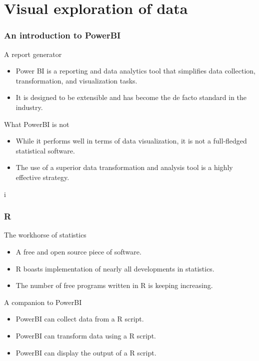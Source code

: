 \documentclass[main.tex]{subfiles}
\begin{document}
\section{Visual exploration of data}
\begin{frame}
    \frametitle{An introduction to PowerBI}
\begin{block}{A report generator}
    \begin{itemize}
        \item<+-> Power BI is a reporting and data analytics tool
        that simplifies data collection, transformation, 
        and visualization tasks.
        \item<+-> It is designed to be extensible and has become
        the de facto standard in the industry.
    \end{itemize}
\end{block}
\begin{block}{What PowerBI is not}
    \begin{itemize}
        \item<+-> While it performs well in terms of data visualization,
         it is not a full-fledged statistical software.
        \item<+-> The use of a superior data transformation
         and analysis tool is a highly effective strategy.
    \end{itemize}
\end{block}    i
\end{frame}
\begin{frame}
    \frametitle{R}
\begin{block}{The workhorse of statistics}
    \begin{itemize}
        \item<+-> A free and open source piece of software.
        \item<+->R boasts implementation of nearly all developments in statistics.
        \item<+-> The number of free programs written in R is keeping increasing.
    \end{itemize}
\end{block}
\begin{block}{A companion to PowerBI}
    \begin{itemize}
        \item<+-> PowerBI can collect data from a R script.
        \item<+-> PowerBI can transform data using a R script.
        \item<+-> PowerBI can display the output of a R script. 
    \end{itemize}
\end{block}    
\end{frame}
\end{document}
